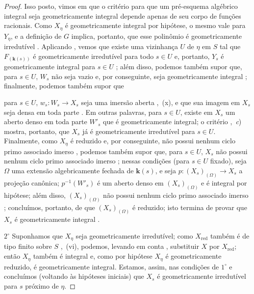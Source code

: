 \begin{proof}
Isso posto, vimos em  que o critério para que um pré-esquema algébrico integral seja geometricamente integral depende apenas de seu corpo de funções racionais. Como $X_\eta$ é geometricamente integral por hipótese, o mesmo vale para $Y_\eta$, e a definição de $G$ implica, portanto, que esse polinômio é geometricamente irredutível .
Aplicando , vemos que existe uma vizinhança $U$ de $\eta$ em $S$ tal que $F_{(\boldsymbol{k}(s))}$ é geometricamente irredutível para todo $s\in U$ e, portanto, $Y_s$ é geometricamente integral para $s\in U$ ; além disso, podemos também supor que, para $s\in U$, $W_s$ não seja vazio  e, por conseguinte, seja geometricamente integral ; finalmente, podemos também supor que


para $s\in U$, $w_s:W_s\to X_s$ seja uma imersão aberta ,~(x), e que sua imagem em $X_s$ seja densa em toda parte .
Em outras palavras, para $s\in U$, existe em $X_s$ um aberto denso em toda parte $W'_s$ que é geometricamente integral; o critério ,~\emph{c}) mostra, portanto, que $X_s$ já é geometricamente irredutível para $s\in U$.
Finalmente, como $X_\eta$ é reduzido e, por conseguinte, não possui nenhum ciclo primo associado imerso , podemos também supor que, para $s\in U$, $X_s$ não possui nenhum ciclo primo associado imerso ; nessas condições (para $s\in U$ fixado), seja $\Omega$ uma extensão algebricamente fechada de $\boldsymbol{k}(s)$, e seja $p:(X_s)_{(\Omega)}\to X_s$ a projeção canônica; $p^{-1}(W'_s)$ é um aberto denso em $(X_s)_{(\Omega)}$  e é integral por hipótese; além disso, $(X_s)_{(\Omega)}$ não possui nenhum ciclo primo associado imerso ; concluímos, portanto, de  que $(X_s)_{(\Omega)}$ é reduzido; isto termina de provar que $X_s$ é geometricamente integral .

$2^\circ$ Suponhamos que $X_\eta$ seja geometricamente irredutível; como $X_{\mathrm{red}}$ também é de tipo finito sobre $S$ ,~(vi), podemos, levando em conta , substituir $X$ por $X_{\mathrm{red}}$; então $X_\eta$ também é integral e, como por hipótese $X_\eta$ é geometricamente reduzido, é geometricamente integral. Estamos, assim, nas condições de $1^\circ$ e concluímos (voltando às hipóteses iniciais) que $X_s$ é geometricamente irredutível para $s$ próximo de $\eta$.


\end{proof}
